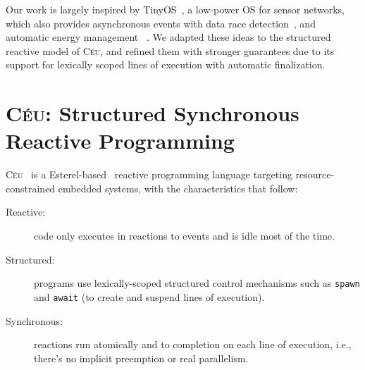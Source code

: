 \documentclass[sigplan,10pt,review,anonymous]{acmart}\settopmatter{printfolios=true,printccs=false,printacmref=false}
\newcommand{\CEU}{\textsc{C\'{e}u}\xspace}
\newcommand{\code}[1] {{\small{\texttt{#1}}}}
\begin{document}
Our work is largely inspired by TinyOS~\cite{wsn.tos}, a low-power OS for
sensor networks, which also provides asynchronous events with %
data race detection~\cite{wsn.nesc}, and automatic energy management
~\cite{wsn.icem}.
%
We adapted these ideas to the structured reactive model of \CEU,
and refined them with stronger guarantees due to its support for lexically
scoped lines of execution with automatic finalization.

\section{\CEU: Structured Synchronous Reactive Programming}
\label{sec.ceu}

\CEU~\cite{ceu.sensys13} is a Esterel-based~\cite{esterel.ieee91}
reactive
programming language targeting resource-constrained embedded systems, with the
characteristics that follow:
%
\begin{description}
\item [Reactive:] code only executes in reactions to events and is idle most of
    the time.
\item [Structured:] programs use lexically-scoped structured control
    mechanisms such as \code{spawn} and \code{await} (to create and suspend
    lines of execution).
\item [Synchronous:] reactions run atomically and to completion on each line of
    execution, i.e., there's no implicit preemption or real parallelism.
\end{description}
\end{document}
